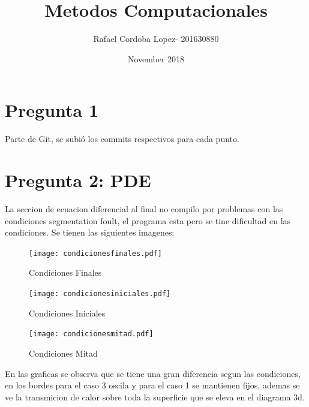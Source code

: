 \documentclass{article}
\title{Metodos Computacionales}
\author{Rafael Cordoba Lopez- 201630880 }
\date{November 2018}
\begin{document}
\maketitle

\section{Pregunta 1}
Parte de Git, se subió los commits respectivos para cada punto.
\section{Pregunta 2: PDE}
La seccion de ecuacion diferencial al final no compilo por problemas con las condiciones segmentation foult, el programa esta pero se tine dificultad en las condiciones. Se tienen las siguientes imagenes:
\begin{figure}
  \centering
    \texttt{[image: condicionesfinales.pdf]}
  \caption{Condiciones Finales}
  \label{fig:ejemplo1}
\end{figure}
\begin{figure}
  \centering
    \texttt{[image: condicionesiniciales.pdf]}
  \caption{Condiciones Iniciales}
  \label{fig:ejemplo2}
\end{figure}

\begin{figure}
  \centering
    \texttt{[image: condicionesmitad.pdf]}
  \caption{Condiciones Mitad}
  \label{fig:ejemplo3}
\end{figure}
En las graficas se observa que se tiene una gran diferencia segun las condiciones, en los bordes para el caso 3 oscila y para el caso 1 se mantienen fijos, ademas se ve la transmicion de calor sobre toda la superficie que se eleva en el diagrama 3d.
\end{document}
